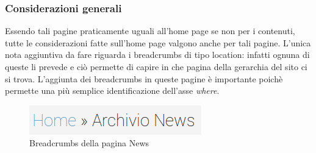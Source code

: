 \documentclass[../ProgettoTecWeb2.tex]{subfiles}
\begin{document}
		\subsubsection{Considerazioni generali}
		Essendo tali pagine praticamente uguali all'home page se non per i contenuti, tutte le considerazioni fatte sull'home page valgono anche per tali pagine. L'unica nota aggiuntiva da fare riguarda i breadcrumbs di tipo location: infatti ognuna di queste li prevede e ciò permette di capire in che pagina della gerarchia del sito ci si trova. L'aggiunta dei breadcrumbs in queste pagine è importante poichè permette una più semplice identificazione dell'asse \textit{where}.
		\begin{figure} [H]
				\centering
				\includegraphics[scale=0.6]{img/BreadcrumbsNews}
				\caption{Breadcrumbs della pagina News}
		\end{figure}

	\newpage
\end{document}
